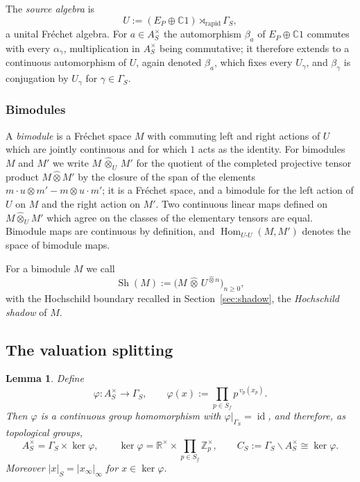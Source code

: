 \documentclass[11pt]{amsart}
\newtheorem{lemma}[theorem]{Lemma}
\theoremstyle{definition}
\theoremstyle{remark}
\newcommand{\C}{\mathbb C}
\newcommand{\R}{\mathbb R}
\newcommand{\Z}{\mathbb Z}
\newcommand{\Hom}{\operatorname{Hom}}
\newcommand{\id}{\operatorname{id}}
\newcommand{\Sh}{\operatorname{Sh}}
\begin{document}
The \emph{source algebra} is
\begin{equation}\label{eq:source}
U:=(E_P\oplus\C 1)\rtimes_{\mathrm{rapid}}\Gamma_S ,
\end{equation}
a unital Fr\'echet algebra.
For $a\in A_S^{\times}$ the automorphism $\beta_a$ of
$E_P\oplus\C1$ commutes with every $\alpha_{\gamma}$, multiplication in
$A_S^{\times}$ being commutative; it therefore extends to a continuous
automorphism of $U$, again denoted $\beta_a$, which fixes every $U_{\gamma}$,
and $\beta_{\gamma}$ is conjugation by $U_{\gamma}$ for
$\gamma\in\Gamma_S$.

\subsubsection*{Bimodules}
A \emph{bimodule} is a Fr\'echet space $M$ with commuting left and right
actions of $U$ which are jointly continuous and for which $1$ acts as the
identity.  For bimodules $M$ and $M'$ we write $M\,\widehat\otimes_U\,M'$ for
the quotient of the completed projective tensor product $M\widehat\otimes M'$
by the closure of the span of the elements $m\cdot u\otimes m'-m\otimes u\cdot m'$;
it is a Fr\'echet space, and a bimodule for the left action of $U$ on $M$ and
the right action on $M'$.  Two continuous linear maps defined on
$M\widehat\otimes_UM'$ which agree on the classes of the elementary tensors
are equal.  Bimodule maps are continuous by definition, and
$\Hom_{U\text{-}U}(M,M')$ denotes the space of bimodule maps.

For a bimodule $M$ we call
\begin{equation}\label{eq:shadow}
\Sh(M):=\bigl(M\,\widehat\otimes\,U^{\widehat\otimes n}\bigr)_{n\ge0},
\end{equation}
with the Hochschild boundary recalled in Section~\ref{sec:shadow}, the
\emph{Hochschild shadow} of $M$.

\subsection{The valuation splitting}

\begin{lemma}\label{thm:split}
Define
\begin{equation}\label{eq:phi}
\varphi:A_S^{\times}\longrightarrow\Gamma_S,\qquad
\varphi(x):=\prod_{p\in S_f}p^{\,v_p(x_p)} .
\end{equation}
Then $\varphi$ is a continuous group homomorphism with
$\varphi|_{\Gamma_S}=\id$, and therefore, as topological groups,
\begin{equation}\label{eq:splitting}
A_S^{\times}=\Gamma_S\times\ker\varphi,\qquad
\ker\varphi=\R^{\times}\times\prod_{p\in S_f}\Z_p^{\times},\qquad
C_S:=\Gamma_S\backslash A_S^{\times}\cong\ker\varphi .
\end{equation}
Moreover $|x|_S=|x_{\infty}|_{\infty}$ for $x\in\ker\varphi$.
\end{lemma}
\end{document}
